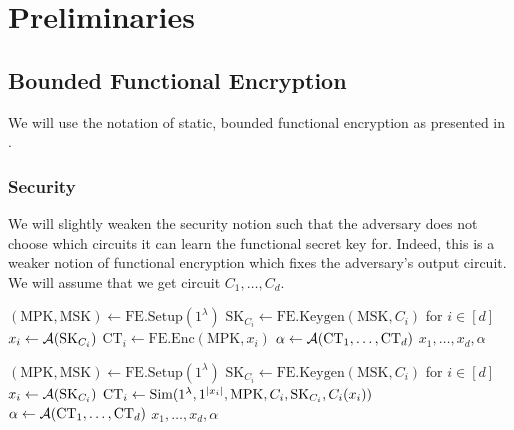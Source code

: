 \newcommand{\MPK}{\text{MPK}}
\newcommand{\MSK}{\text{MSK}}
\newcommand{\SK}{\text{SK}}
\newcommand{\Enc}{\texttt{Enc}}
\newcommand{\Dec}{\texttt{Dec}}
\newcommand{\FEEnc}{\text{FE.Enc}}
\newcommand{\FEDec}{\text{FE.Dec}}
\newcommand{\FESetup}{\text{FE.Setup}}
\newcommand{\FEKeygen}{\text{FE.Keygen}}
\newcommand{\FECT}{\text{CT}}
\newcommand{\adversD}{\mathcal{D}}


\section{Preliminaries}
\subsection{Bounded Functional Encryption}
We will use the notation of static, bounded functional encryption as presented in
\cite{agrawal2017functional}.

\subsubsection*{Security}
We will slightly weaken the security notion such that the adversary does not choose
which circuits it can learn the functional secret key for. Indeed, this is a weaker notion of functional encryption
which fixes the adversary's output circuit.
We will assume that we get circuit $C_1, \dots, C_d$.



\begin{minipage}{0.46\textwidth}
\begin{algorithm}[H]
    \centering
    \caption{$\ExpReal(1^\lambda)$}
    \begin{algorithmic}[1]
        \State $(\MPK, \MSK) \gets \FESetup(1^\lambda)$
				\State $\SK_{C_i} \gets \FEKeygen(\MSK, C_i)$ for $i \in [d]$
				\State $x_i \gets \advers(\SK_{C_i})$
				\State $\FECT_i \gets \FEEnc(\MPK, x_i)$
				\State $\alpha \gets \advers(\FECT_1, \dots, \FECT_d)$
				\State \Return $x_1, \dots, x_d, \alpha$
    \end{algorithmic}
		\label{alg:FEExprReal}
\end{algorithm}
\end{minipage}
\hfill
\begin{minipage}{0.46\textwidth}
\begin{algorithm}[H]
    \centering
    \caption{$\ExpSim(1^\lambda)$}\label{alg:FEExprSim}
    \begin{algorithmic}[1]
        \State $(\MPK, \MSK) \gets \FESetup(1^\lambda)$
				\State $\SK_{C_i} \gets \FEKeygen(\MSK, C_i)$ for $i \in [d]$
				\State $x_i \gets \advers(\SK_{C_i})$
				\State $\FECT_i \gets \Sim(1^\lambda, 1^{|x_i|}, \MPK, C_i, \SK_{C_i}, C_i(x_i))$
				\State $\alpha \gets \advers(\FECT_1, \dots, \FECT_d)$
				\State \Return $x_1, \dots, x_d, \alpha$
    \end{algorithmic}
\end{algorithm}
\end{minipage}

